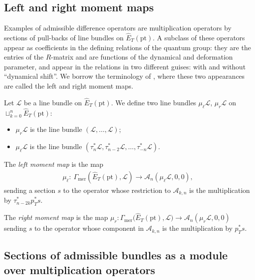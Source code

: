 \documentclass[pdftex]{sigma}
\numberwithin{equation}{section}
\begin{document}
\subsection{Left and right moment maps}

Examples of admissible difference operators are multiplication operators by sections of pull-backs of line bundles on $\hat E_T(\mathrm{pt})$. A subclass of these operators appear as coefficients in the defining relations of
the quantum group: they are the entries of the $R$-matrix and are functions of the dynamical and deformation parameter, and appear in the relations in two different guises: with and without ``dynamical shift''. We borrow the terminology of \cite[Section~3]{EtingofVarchenko}, where these two appearances are called the left and right moment maps.

Let $\mathcal L$ be a line bundle on $\hat E_T(\mathrm{pt})$. We define two line bundles $\mu_\ell\mathcal L$, $\mu_r\mathcal L$ on $\sqcup_{k=0}^n\hat E_T(\mathrm{pt})$:
\begin{itemize}\itemsep=0pt
\item $\mu_r\mathcal L$ is the line bundle $(\mathcal L,\dots,\mathcal L)$;
\item $\mu_\ell\mathcal L$ is the line bundle $(\tau_n^*\mathcal L,\tau_{n-2}^*\mathcal L,\dots,\tau_{-n}^*\mathcal L)$.
\end{itemize}
\begin{Definition} The {\em left moment map} is the map
 \begin{gather*}
 \mu_\ell\colon \ \Gamma_{\mathrm{mer}}(\hat E_T(\mathrm{pt}),\mathcal L)\to\mathcal A_n(\mu_\ell\mathcal L,0,0),
 \end{gather*}
 sending a section $s$ to the operator whose restriction to $\mathcal A_{k,n}$ is the multiplication by $\tau_{n-2k}^*p_T^*s$.

The {\em right moment map} is the map $\mu_r\colon\Gamma_{\mathrm{mer}}\big(\hat E_T(\mathrm{pt}),\mathcal L\big) \to\mathcal A_n(\mu_r\mathcal L,0,0)$ sending $s$ to the operator whose component in $\mathcal A_{k,n}$ is
the multiplication by $p_T^*s$.
\end{Definition}
\subsection{Sections of admissible bundles as a module over multiplication operators}
\end{document}
